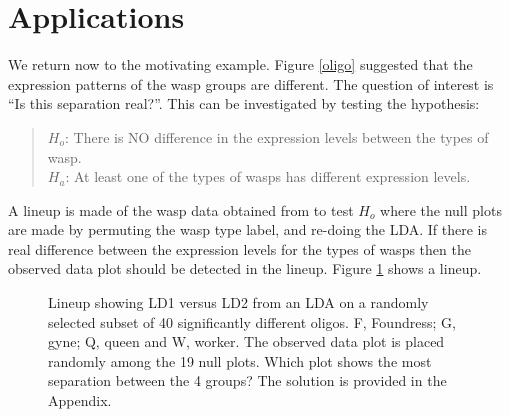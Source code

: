 \section{Applications}

We return now to the motivating example. Figure \ref{oligo} suggested that the expression patterns of the wasp groups are different.  The question of interest is ``Is this separation real?''. This can be investigated by testing the hypothesis: 

\begin{quote}
$H_o$: There is NO difference in the expression levels between the types of wasp.\\
$H_a$: At least one of the types of wasps has different expression levels.
\end{quote}
A lineup is made of the wasp data obtained from \cite{toth:2010} to test $H_o$ where the null plots are made by permuting the wasp type label, and re-doing the LDA. If there is real difference between the expression levels for the types of wasps then the observed data plot should be detected in the lineup. Figure \ref{toth_lineup} shows a lineup. 

\begin{figure}[hbtp]
   \centering
       \caption{Lineup showing LD1 versus LD2 from an LDA on a randomly selected subset of 40 significantly different oligos. F, Foundress; G, gyne; Q, queen and W, worker. The observed data plot is placed randomly among the 19 null plots. Which plot shows the most separation between the 4 groups? The solution is provided in the Appendix.}
       \label{toth_lineup}
\end{figure} 

